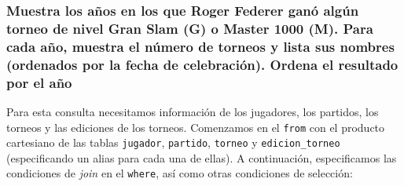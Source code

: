 \subsubsection{Muestra los años en los que Roger Federer ganó algún torneo de nivel Gran Slam (G) o Master 1000 (M). Para cada año, muestra el número de torneos y lista sus nombres (ordenados por la fecha de celebración). Ordena el resultado por el año}

Para esta consulta necesitamos información de los jugadores, los partidos, los torneos y las ediciones de los torneos. Comenzamos en el \texttt{from} con el producto cartesiano de las tablas \texttt{jugador}, \texttt{partido}, \texttt{torneo} y \texttt{edicion\_torneo} (especificando un alias para cada una de ellas). A continuación, especificamos las condiciones de \textit{join} en el \texttt{where}, así como otras condiciones de selección:
